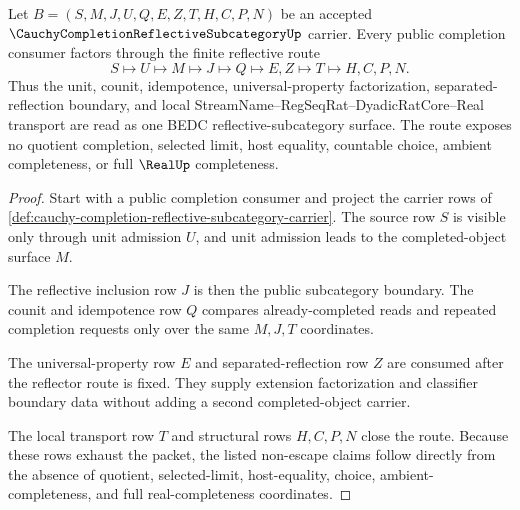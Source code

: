 \begin{theorem}
\label{thm:cauchy-completion-reflective-subcategory-reflection-law}
Let $B=(S,M,J,U,Q,E,Z,T,H,C,P,N)$ be an accepted $\CauchyCompletionReflectiveSubcategoryUp$ carrier. Every public completion consumer factors through the finite reflective route
$$
S\longmapsto U\longmapsto M\longmapsto J\longmapsto Q\longmapsto E,Z\longmapsto T\longmapsto H,C,P,N .
$$
Thus the unit, counit, idempotence, universal-property factorization, separated-reflection boundary, and local StreamName--RegSeqRat--DyadicRatCore--Real transport are read as one BEDC reflective-subcategory surface. The route exposes no quotient completion, selected limit, host equality, countable choice, ambient completeness, or full $\RealUp$ completeness.
\end{theorem}
\begin{proof}
Start with a public completion consumer and project the carrier rows of \autoref{def:cauchy-completion-reflective-subcategory-carrier}. The source row $S$ is visible only through unit admission $U$, and unit admission leads to the completed-object surface $M$.

The reflective inclusion row $J$ is then the public subcategory boundary. The counit and idempotence row $Q$ compares already-completed reads and repeated completion requests only over the same $M,J,T$ coordinates.

The universal-property row $E$ and separated-reflection row $Z$ are consumed after the reflector route is fixed. They supply extension factorization and classifier boundary data without adding a second completed-object carrier.

The local transport row $T$ and structural rows $H,C,P,N$ close the route. Because these rows exhaust the packet, the listed non-escape claims follow directly from the absence of quotient, selected-limit, host-equality, choice, ambient-completeness, and full real-completeness coordinates.
\end{proof}


